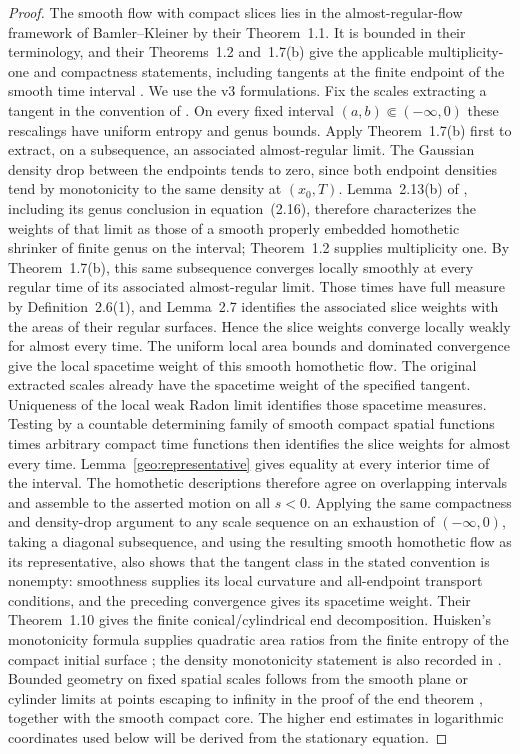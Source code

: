 \begin{proof}
The smooth flow with compact slices lies in the almost-regular-flow
framework of Bamler--Kleiner by their Theorem~1.1.  It is bounded in
their terminology, and their Theorems~1.2 and~1.7(b) give the applicable
multiplicity-one and compactness statements, including tangents at
the finite endpoint of the smooth time interval \cite{BK2024}.
We use the v3 formulations.  Fix the scales extracting a tangent in the
convention of .  On every fixed interval
$(a,b)\Subset(-\infty,0)$ these rescalings have uniform entropy and
genus bounds.  Apply Theorem~1.7(b) first to extract, on a subsequence,
an associated almost-regular limit.  The Gaussian density drop between the endpoints tends
to zero, since both endpoint densities tend by monotonicity to the
same density at $(x_0,T)$.  Lemma~2.13(b) of \cite{BK2024}, including
its genus conclusion in equation~(2.16), therefore characterizes the
weights of that limit as those of a smooth properly embedded homothetic
shrinker of finite genus on the interval; Theorem~1.2 supplies multiplicity one.
By Theorem~1.7(b), this same subsequence converges locally
smoothly at every regular time of its associated almost-regular limit.
Those times have full measure by Definition~2.6(1), and Lemma~2.7
identifies the associated slice weights with the areas of their regular
surfaces.  Hence the slice weights converge locally weakly for almost
every time.  The uniform local area bounds and dominated convergence
give the local spacetime weight of this smooth homothetic flow.  The original extracted scales
already have the spacetime weight of the specified tangent.  Uniqueness
of the local weak Radon limit identifies those spacetime measures.
Testing by a countable determining family of smooth compact spatial
functions times arbitrary compact time functions then identifies the
slice weights for almost every time.  Lemma~\ref{geo:representative}
gives equality at every interior time of the interval.  The homothetic
descriptions therefore agree on overlapping intervals and assemble to
the asserted motion on all $s<0$.
Applying the same compactness and density-drop argument to any scale
sequence on an exhaustion of $(-\infty,0)$, taking a diagonal
subsequence, and using the resulting smooth homothetic flow as its
representative, also shows that the tangent class in the stated
convention is nonempty: smoothness supplies its local curvature and
all-endpoint transport conditions, and the preceding convergence gives
its spacetime weight.
Their Theorem~1.10 gives the finite conical/cylindrical end decomposition.
Huisken's monotonicity formula supplies quadratic area ratios from the
finite entropy of the compact initial surface \cite{Huisken1990};
the density monotonicity statement is also recorded in
\cite[Section~2.9]{White2005}.  Bounded geometry on fixed spatial
scales follows from the smooth plane or cylinder limits at points
escaping to infinity in the proof of the end theorem
\cite[Claim~7.6]{BK2024}, together with the smooth compact core.
The higher end estimates in logarithmic coordinates used below will
be derived from the stationary equation.
\end{proof}

